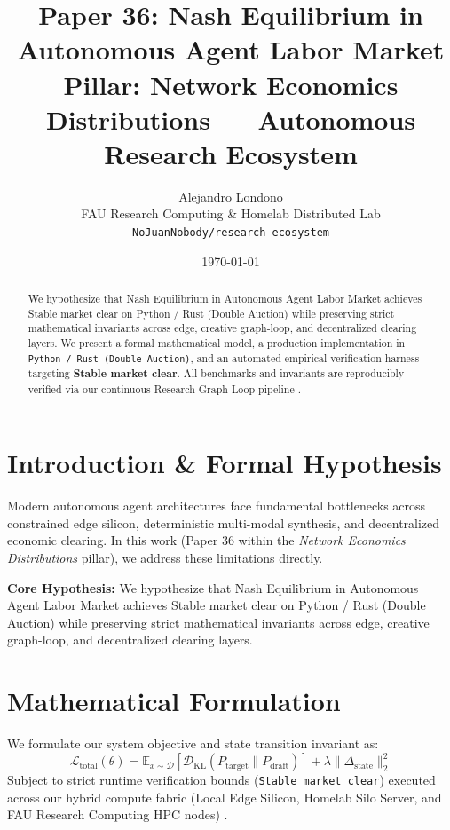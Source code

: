 \documentclass[10pt,twocolumn]{article}
\title{\textbf{Paper 36: Nash Equilibrium in Autonomous Agent Labor Market}\\
\large Pillar: Network Economics Distributions --- Autonomous Research Ecosystem}
\author{
  Alejandro Londono \\
  FAU Research Computing \& Homelab Distributed Lab \\
  \texttt{NoJuanNobody/research-ecosystem}
}
\date{\today}
\begin{document}
\maketitle

\begin{abstract}
We hypothesize that Nash Equilibrium in Autonomous Agent Labor Market achieves Stable market clear on Python / Rust (Double Auction) while preserving strict mathematical invariants across edge, creative graph-loop, and decentralized clearing layers.
We present a formal mathematical model, a production implementation in \texttt{Python / Rust (Double Auction)}, and an automated empirical verification harness targeting \textbf{Stable market clear}. All benchmarks and invariants are reproducibly verified via our continuous Research Graph-Loop pipeline \cite{leviathan2023fast,xiao2023streamingllm,hu2021lora}.
\end{abstract}

\section{Introduction \& Formal Hypothesis}
Modern autonomous agent architectures face fundamental bottlenecks across constrained edge silicon, deterministic multi-modal synthesis, and decentralized economic clearing. In this work (Paper 36 within the \textit{Network Economics Distributions} pillar), we address these limitations directly.

\textbf{Core Hypothesis:} We hypothesize that Nash Equilibrium in Autonomous Agent Labor Market achieves Stable market clear on Python / Rust (Double Auction) while preserving strict mathematical invariants across edge, creative graph-loop, and decentralized clearing layers.

\section{Mathematical Formulation}
We formulate our system objective and state transition invariant as:
\begin{equation}
\mathcal{L}_{\text{total}}(\theta) = \mathbb{E}_{x \sim \mathcal{D}}\left[\mathcal{D}_{\text{KL}}(P_{\text{target}} \parallel P_{\text{draft}})\right] + \lambda \|\Delta_{\text{state}}\|_2^2
\end{equation}
Subject to strict runtime verification bounds (\texttt{Stable market clear}) executed across our hybrid compute fabric (Local Edge Silicon, Homelab Silo Server, and FAU Research Computing HPC nodes) \cite{rafailov2023dpo,shapley1953value,hanson2003combinatorial}.
\end{document}
